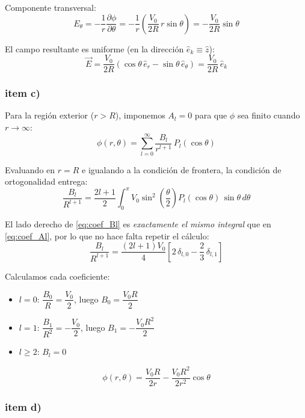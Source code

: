 \documentclass[a4paper]{article}
\begin{document}
Componente transversal:
$$E_\theta = -\frac{1}{r}\frac{\partial\phi}{\partial\theta}
           = -\frac{1}{r}\left(\frac{V_0}{2R}\,r\sin\theta\right)
           = -\frac{V_0}{2R}\sin\theta$$

El campo resultante es uniforme (en la dirección $\hat{e}_k \equiv \hat{z}$):
$$\vec{E} = \frac{V_0}{2R}\!\left(\cos\theta\,\hat{e}_r - \sin\theta\,\hat{e}_\theta\right)
= \frac{V_0}{2R}\,\hat{e}_k$$

\subsubsection*{item c)}

Para la región exterior ($r > R$), imponemos $A_l = 0$ para que $\phi$ sea finito cuando
$r\to\infty$:
\begin{equation}
    \phi(r,\theta) = \sum_{l=0}^{\infty} \frac{B_l}{r^{l+1}}\,P_l(\cos\theta)
\end{equation}

Evaluando en $r = R$ e igualando a la condición de frontera, la condición de ortogonalidad entrega:
\begin{equation}
    \frac{B_l}{R^{l+1}} = \frac{2l+1}{2}\int_0^{\pi} V_0\sin^2\!\left(\frac{\theta}{2}\right)
    P_l(\cos\theta)\,\sin\theta\,d\theta
    \label{eq:coef_Bl}
\end{equation}

El lado derecho de \eqref{eq:coef_Bl} es \emph{exactamente el mismo integral} que en
\eqref{eq:coef_Al}, por lo que no hace falta repetir el cálculo:
$$\frac{B_l}{R^{l+1}} = \frac{(2l+1)V_0}{4}\left[2\,\delta_{l,0} - \frac{2}{3}\,\delta_{l,1}\right]$$

Calculamos cada coeficiente:
\begin{itemize}
    \item $l = 0$: $\dfrac{B_0}{R} = \dfrac{V_0}{2}$, luego $B_0 = \dfrac{V_0 R}{2}$
    \item $l = 1$: $\dfrac{B_1}{R^2} = -\dfrac{V_0}{2}$, luego $B_1 = -\dfrac{V_0 R^2}{2}$
    \item $l \ge 2$: $B_l = 0$
\end{itemize}

\begin{tcolorbox}
$$\phi(r,\theta) = \frac{V_0 R}{2r} - \frac{V_0 R^2}{2r^2}\cos\theta$$
\end{tcolorbox}

\subsubsection*{item d)}
\end{document}
